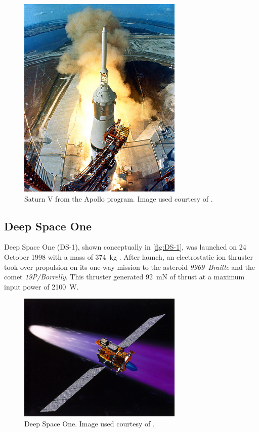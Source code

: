 \begin{figure}[ht]
\centering
\includegraphics  [width=0.7\textwidth] {Images/Apollo_11_Launch2.jpg}
\caption{Saturn V from the Apollo program. Image used courtesy of \textcite{web_Apollo11}.}
\label{fig:SaturnV}
\end{figure}

\subsection{Deep Space One}
Deep Space One (DS-1), shown conceptually in \autoref{fig:DS-1}, was launched on 24 October 1998 with a mass of 374~kg \parencite{web_DS-1}. After launch, an electrostatic ion thruster took over propulsion on its one-way mission to the asteroid \emph{9969~Braille} and the comet \emph{19P/Borrelly}. This thruster generated 92~mN of thrust at a maximum input power of 2100~W. 

\begin{figure}[ht]
\centering
\includegraphics [width=0.7\textwidth] {Images/765px-Deep_Space_1_using_its_ion_engine.jpg}
\caption{Deep Space One. Image used courtesy of \textcite{web_DS-1}.}
\label{fig:DS-1}
\end{figure}
 
